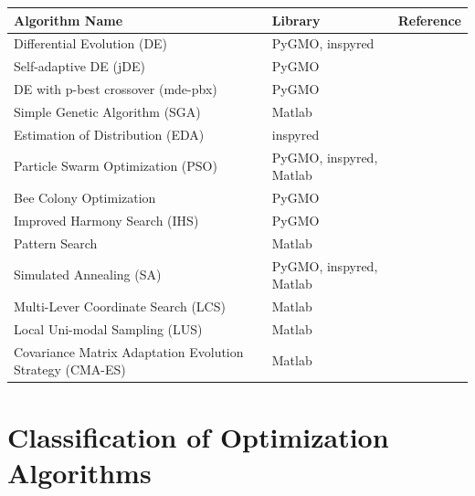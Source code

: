 \documentclass[a4paper,titlepage]{report}
\begin{document}
\begin{table}
    \begin{tabular}{|l|l|l|}
        \hline
        Algorithm Name                              & Library &   Reference   \\
        \hline
        Differential Evolution (DE)                 & PyGMO, inspyred  &      \\ 
        Self-adaptive DE (jDE)                      & PyGMO   &               \\ 
        DE with p-best crossover (mde-pbx)          & PyGMO   &               \\ 
        Simple Genetic Algorithm (SGA)              & Matlab  &
        \cite{matlab-toolbox}\\ 
        Estimation of Distribution (EDA)            & inspyred &              \\ 
        Particle Swarm Optimization (PSO)           & PyGMO, inspyred, Matlab&
        \cite{matlab-pso}\\ 
        Bee Colony Optimization                     & PyGMO  &                \\ 
        Improved Harmony Search (IHS)               & PyGMO  &                \\ 
        Pattern Search                              & Matlab  &
        \cite{matlab-toolbox}\\ 
        Simulated Annealing (SA)                    & PyGMO, inspyred, Matlab&
        \cite{matlab-toolbox}\\ 
        
        Multi-Lever Coordinate Search (LCS)         & Matlab  &               \\ 
        Local Uni-modal Sampling (LUS)              & Matlab   &
        \cite{matlab-lus}\\ 
        Covariance Matrix Adaptation Evolution Strategy (CMA-ES) & Matlab&    \\
        \hline
    \end{tabular}
\end{table}

\section{Classification of Optimization Algorithms}
\end{document}
